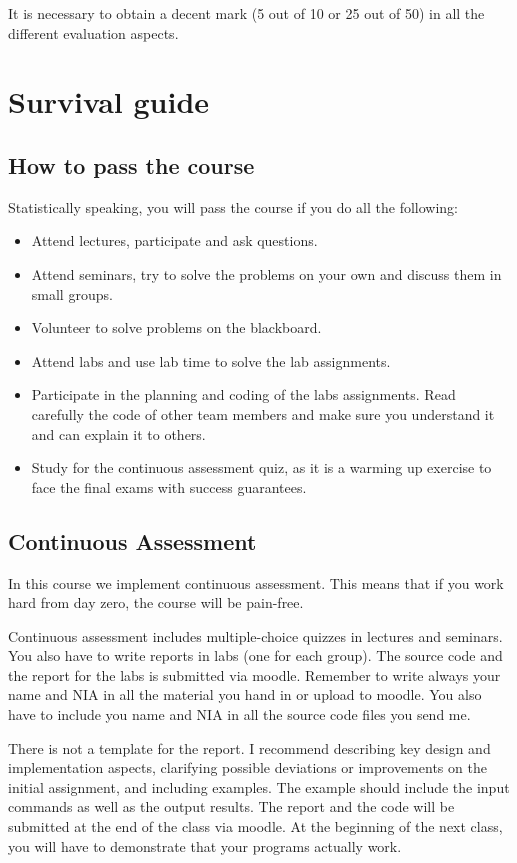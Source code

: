 It is necessary to obtain a decent mark (5 out of 10 or 25 out of 50) in all the different evaluation aspects.

\section{Survival guide}

\subsection{How to pass the course}

Statistically speaking, you will pass the course if you do all the following:
\begin{itemize}
\item Attend lectures, participate and ask questions.
\item Attend seminars, try to solve the problems on your own and discuss them in small groups.
\item Volunteer to solve problems on the blackboard.
\item Attend labs and use lab time to solve the lab assignments.
\item Participate in the planning and coding of the labs assignments. Read carefully the code of other team members and make sure you understand it and can explain it to others.
\item Study for the continuous assessment quiz, as it is a warming up exercise to face the final exams with success guarantees.
\end{itemize}

\subsection{Continuous Assessment}
In this course we implement continuous assessment.
This means that if you work hard from day zero, the course will be pain-free.

Continuous assessment includes multiple-choice quizzes in lectures and seminars.
You also have to write reports in labs (one for each group).
The source code and the report for the labs is submitted via moodle.
Remember to write always your name and NIA in all the material you hand in or upload to moodle. 
You also have to include you name and NIA in all the source code files you send me.

There is not a template for the report.
I recommend describing key design and implementation aspects, clarifying possible deviations or improvements on the initial assignment, and including examples.
The example should include the input commands as well as the output results.
The report and the code will be submitted at the end of the class via moodle.
At the beginning of the next class, you will have to demonstrate that your programs actually work.

